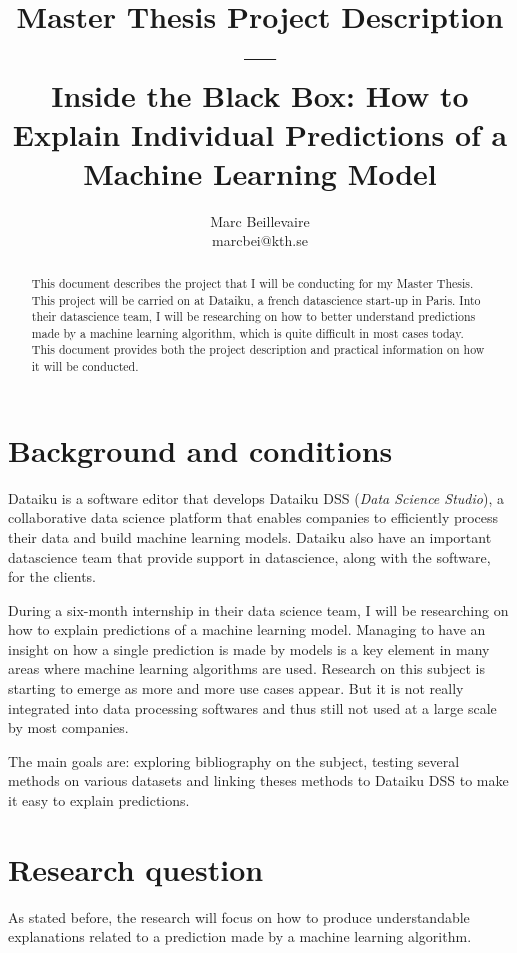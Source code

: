 \documentclass[a4paper]{article}
\title{Master Thesis Project Description \\ — \\ Inside the Black Box: How to Explain Individual Predictions of a Machine Learning Model}
\author{Marc Beillevaire \\ marcbei@kth.se}
\begin{document}
\maketitle

\begin{abstract}
This document describes the project that I will be conducting for my Master Thesis. This project will be carried on at Dataiku, a french datascience start-up in Paris. Into their datascience team, I will be researching on how to better understand predictions made by a machine learning algorithm, which is quite difficult in most cases today. This document provides both the project description and practical information on how it will be conducted.
\end{abstract}

\section{Background and conditions}

Dataiku is a software editor that develops Dataiku DSS (\textit{Data Science Studio}), a collaborative data science platform that enables companies to efficiently process their data and build machine learning models. Dataiku also have an important datascience team that provide support in datascience, along with the software, for the clients.

During a six-month internship in their data science team, I will be researching on how to explain predictions of a machine learning model. Managing to have an insight on how a single prediction is made by models is a key element in many areas where machine learning algorithms are used. Research on this subject is starting to emerge as more and more use cases appear. But it is not really integrated into data processing softwares and thus still not used at a large scale by most companies.

The main goals are: exploring bibliography on the subject, testing several methods on various datasets and linking theses methods to Dataiku DSS to make it easy to explain predictions.


\section{Research question}

As stated before, the research will focus on how to produce understandable explanations related to a prediction made by a machine learning algorithm.
\end{document}
